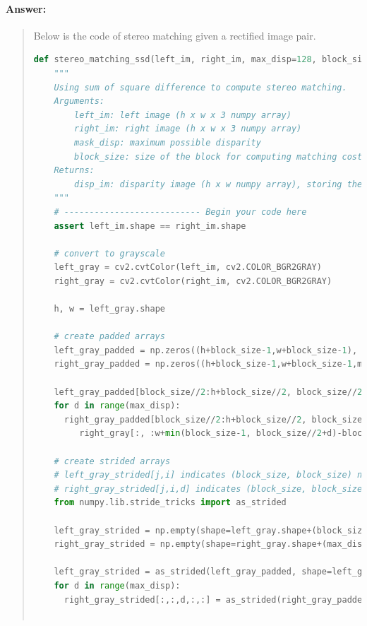 \documentclass[11pt]{article}
\begin{document}
\paragraph{Answer:} 
\begin{quote}

Below is the code of stereo matching given a rectified image pair.

\begin{lstlisting}[language=Python, basicstyle=\tiny]
def stereo_matching_ssd(left_im, right_im, max_disp=128, block_size=21):
    """
    Using sum of square difference to compute stereo matching.
    Arguments:
        left_im: left image (h x w x 3 numpy array)
        right_im: right image (h x w x 3 numpy array)
        mask_disp: maximum possible disparity
        block_size: size of the block for computing matching cost
    Returns:
        disp_im: disparity image (h x w numpy array), storing the disparity values
    """
    # --------------------------- Begin your code here
    assert left_im.shape == right_im.shape
  
    # convert to grayscale
    left_gray = cv2.cvtColor(left_im, cv2.COLOR_BGR2GRAY)
    right_gray = cv2.cvtColor(right_im, cv2.COLOR_BGR2GRAY)
    
    h, w = left_gray.shape
    
    # create padded arrays
    left_gray_padded = np.zeros((h+block_size-1,w+block_size-1), dtype=left_gray.dtype)
    right_gray_padded = np.zeros((h+block_size-1,w+block_size-1,max_disp), dtype=right_gray.dtype)
    
    left_gray_padded[block_size//2:h+block_size//2, block_size//2:w+block_size//2] = left_gray
    for d in range(max_disp):
      right_gray_padded[block_size//2:h+block_size//2, block_size//2+d:w+min(block_size-1, block_size//2+d), d] =\
         right_gray[:, :w+min(block_size-1, block_size//2+d)-block_size//2-d]
  
    # create strided arrays
    # left_gray_strided[j,i] indicates (block_size, block_size) np.array around left_gray[i,j]
    # right_gray_strided[j,i,d] indicates (block_size, block_size) np.array around right_gray[i,j]
    from numpy.lib.stride_tricks import as_strided
  
    left_gray_strided = np.empty(shape=left_gray.shape+(block_size,block_size), dtype=left_gray.dtype)
    right_gray_strided = np.empty(shape=right_gray.shape+(max_disp,)+(block_size,block_size), dtype=right_gray.dtype)
  
    left_gray_strided = as_strided(left_gray_padded, shape=left_gray.shape+(block_size,block_size), strides=left_gray_padded.strides*2)
    for d in range(max_disp):
      right_gray_strided[:,:,d,:,:] = as_strided(right_gray_padded[:,:,d], shape=right_gray.shape+(block_size,block_size), strides=right_gray_padded.strides[:-1]*2)
  

\end{lstlisting}
\end{quote}
\end{document}

